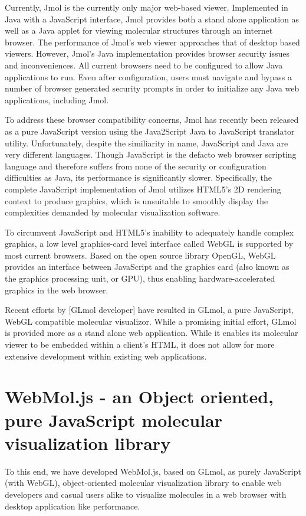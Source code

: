 \documentclass[]{bioinfo}
\begin{document}
Currently, Jmol \cite{jmol} is the currently only major web-based viewer.  Implemented in Java with a JavaScript interface, Jmol provides both a stand alone application as well as a Java applet for viewing molecular structures through an internet browser.  The performance of Jmol's web viewer approaches that of desktop based viewers. However, Jmol's Java implementation provides browser security issues and inconveniences.  All current browsers need to be configured to allow Java applications to run.  Even after configuration, users must navigate and bypass a number of browser generated security prompts in order to initialize any Java web applications, including Jmol.  

To address these browser compatibility concerns, Jmol has recently been released as a pure JavaScript version using the Java2Script Java to JavaScript translator utility.  Unfortunately, despite the similiarity in name, JavaScript and Java are very different languages. Though JavaScript is the defacto web browser scripting language and therefore suffers from none of the security or configuration difficulties as Java, its performance is significantly slower.  Specifically, the complete JavaScript implementation of Jmol utilizes HTML5's 2D rendering context to produce graphics, which is unsuitable to smoothly display the complexities demanded by molecular visualization software.  

To circumvent JavaScript and HTML5's inability to adequately handle complex graphics, a low level graphics-card level interface called WebGL is supported by most current browsers.  Based on the open source library OpenGL, WebGL provides an interface between JavaScript and the graphics card (also known as the graphics processing unit, or GPU), thus enabling hardware-accelerated graphics in the web browser.

Recent efforts by [GLmol developer] have resulted in GLmol, a pure JavaScript, WebGL compatible molecular visualizor. While a promising initial effort, GLmol is provided more as a stand alone web application.  While it enables its molecular viewer to be embedded within a client's HTML, it does not allow for more extensive development within existing web applications.

\section{WebMol.js - an Object oriented, pure JavaScript molecular visualization library}
To this end, we have developed WebMol.js, based on GLmol, as purely JavaScript (with WebGL), object-oriented molecular visualization library to enable web developers and casual users alike to visualize molecules in a web browser with desktop application like performance.  
\end{document}
